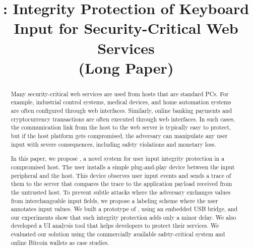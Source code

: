 


\newif\ifpaper
\papertrue

\newif\ifbold
\boldtrue

\newif\ifdesperatetime

\graphicspath{{images/}}


\title{\name: Integrity Protection of Keyboard Input for Security-Critical Web Services \\ (Long Paper)}


\maketitle
{}
\begin{abstract}
Many security-critical web services are used from hosts that are standard PCs. For example, industrial control systems, medical devices, and home automation systems are often configured through web interfaces. Similarly, online banking payments and cryptocurrency transactions are often executed through web interfaces. In such cases, the communication link from the host to the web server is typically easy to protect, but if the host platform gets compromised, the adversary can manipulate any user input with severe consequences, including safety violations and monetary loss.

In this paper, we propose \name, a novel system for user input integrity protection in a compromised host. The user installs a simple plug-and-play device between the input peripheral and the host. This device observes user input events and sends a trace of them to the server that compares the trace to the application payload received from the untrusted host. To prevent subtle attacks where the adversary exchanges values from interchangeable input fields, we propose a labeling scheme where the user annotates input values.  We built a prototype of \name, using an embedded USB bridge, and our experiments show that such integrity protection adds only a minor delay. We also developed a UI analysis tool that helps developers to protect their services. We evaluated our solution using the commercially available safety-critical system and online Bitcoin wallets as case studies.
\end{abstract}

 
















%


